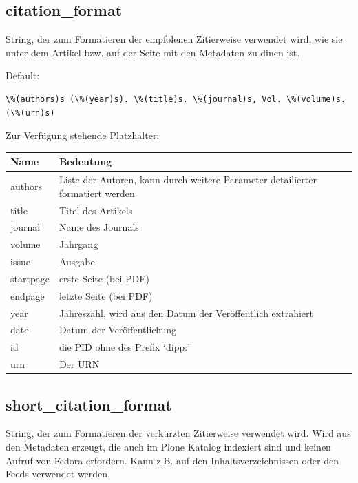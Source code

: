 \documentclass[a4paper,10pt,ngerman]{sphinxmanual}
\begin{document}
\subsection{citation\_format}
\label{dipp_properties:citation-format}
String, der zum Formatieren der empfolenen Zitierweise verwendet wird, wie sie
unter dem Artikel bzw. auf der Seite mit den Metadaten zu dinen ist.

Default:

\begin{Verbatim}[commandchars=\\\{\}]
\%(authors)s (\%(year)s). \%(title)s. \%(journal)s, Vol. \%(volume)s. (\%(urn)s)
\end{Verbatim}

Zur Verfügung stehende Platzhalter:

\begin{tabulary}{\linewidth}{|L|L|}
\hline
\textbf{
Name
} & \textbf{
Bedeutung
}\\\hline

authors
 & 
Liste der Autoren, kann durch weitere Parameter detailierter
formatiert werden
\\\hline

title
 & 
Titel des Artikels
\\\hline

journal
 & 
Name des Journals
\\\hline

volume
 & 
Jahrgang
\\\hline

issue
 & 
Ausgabe
\\\hline

startpage
 & 
erste Seite (bei PDF)
\\\hline

endpage
 & 
letzte Seite (bei PDF)
\\\hline

year
 & 
Jahreszahl, wird aus den Datum der Veröffentlich extrahiert
\\\hline

date
 & 
Datum der Veröffentlichung
\\\hline

id
 & 
die PID ohne des Prefix `dipp:'
\\\hline

urn
 & 
Der URN
\\\hline
\end{tabulary}



\subsection{short\_citation\_format}
\label{dipp_properties:short-citation-format}\label{dipp_properties:prop-short-citation-format}
String, der zum Formatieren der verkürzten Zitierweise verwendet wird. Wird aus
den Metadaten erzeugt, die auch im Plone Katalog indexiert sind und keinen
Aufruf von Fedora erfordern. Kann z.B. auf den Inhaltsverzeichnissen oder den
Feeds verwendet werden.
\end{document}
